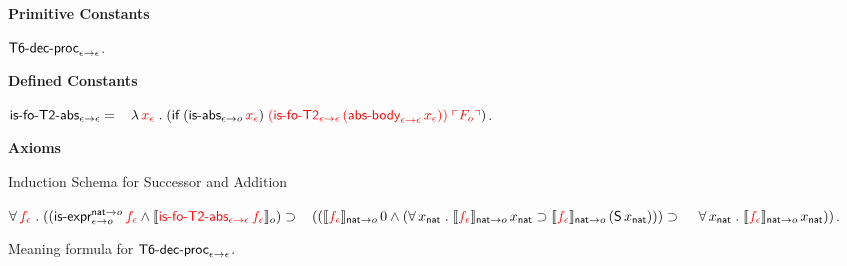 \documentclass[fleqn,11pt]{article}
\begin{document}
  \ee
    
  \item[] \textbf{Primitive Constants}

  \be

    \setcounter{enumi}{7}

    \item $\mbox{\sf T6-dec-proc}_{\epsilon \rightarrow \epsilon}$.

  \ee

  \item[] \textbf{Defined Constants}

  \be

    \setcounter{enumi}{6}

    \item $\mbox{\sf is-fo-T2-abs}_{\epsilon \rightarrow \epsilon} = {}\\
    \hspace*{2ex}\lambda\, \textcolor{red}{x_\epsilon} \mathrel. 
    (\mbox{\sf if} \; (\mbox{\sf is-abs}_{\epsilon \rightarrow o} \, \textcolor{red}{x_\epsilon}) \;
    \textcolor{red}{(\mbox{\sf is-fo-T2}_{\epsilon \rightarrow \epsilon} \,
    (\mbox{\sf abs-body}_{\epsilon \rightarrow \epsilon} \, x_\epsilon))} \;
    \textcolor{red}{\ulcorner F_o\urcorner})$.

  \ee

  \item[] \textbf{Axioms}

  \be

    \setcounter{enumi}{30}

    \item Induction Schema for Successor and Addition

    $\forall\, \textcolor{red}{f_\epsilon} \mathrel. 
    ((\mbox{\sf is-expr}_{\epsilon \rightarrow o}^{{\sf nat} \rightarrow o} \, \textcolor{red}{f_\epsilon} \wedge
    \llbracket\textcolor{red}{\mbox{\sf is-fo-T2-abs}_{\epsilon \rightarrow \epsilon} \, 
    f_\epsilon}\rrbracket_o) \supset {} \\
    \hspace*{2ex}((\llbracket\textcolor{red}{f_\epsilon}\rrbracket_{{\sf nat} \rightarrow o} \, 0 \wedge
    (\forall\, x_{\sf nat} \mathrel. 
    \llbracket\textcolor{red}{f_\epsilon}\rrbracket_{{\sf nat} \rightarrow o} \, x_{\sf nat} \supset
    \llbracket\textcolor{red}{f_\epsilon}\rrbracket_{{\sf nat} \rightarrow o} \, 
    (\mbox{\sf S} \, x_{\sf nat}))) \supset 
    \hspace*{2.8ex}\forall\, x_{\sf nat} \mathrel. 
    \llbracket\textcolor{red}{f_\epsilon}\rrbracket_{{\sf nat} \rightarrow o} \, x_{\sf nat}))$.

    \item Meaning formula for $\mbox{\sf T6-dec-proc}_{\epsilon \rightarrow \epsilon}$.
\end{document}
